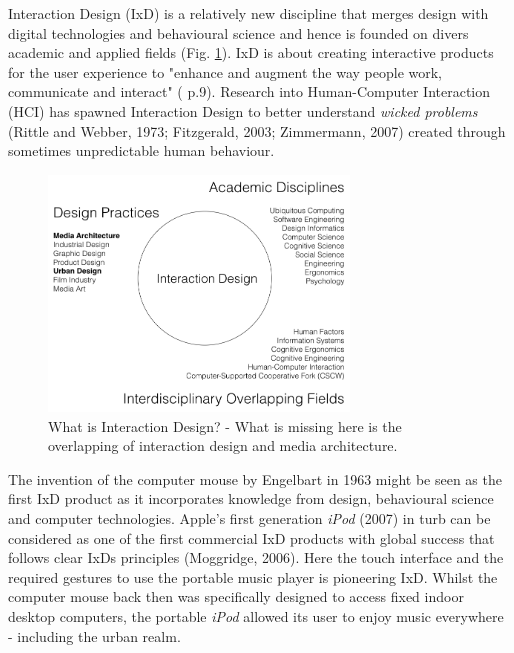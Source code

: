 
Interaction Design (IxD)  is a relatively new discipline that merges design with digital technologies and behavioural science and hence is founded on divers academic and applied fields (Fig. \ref{DesignFields}).
IxD is about creating interactive products for the user experience to "enhance and augment the way people work, communicate and interact" (\cite{Rogers_2015} p.9).
Research into Human-Computer Interaction (HCI)  has spawned Interaction Design \cite{Rogers_2015} to better understand \textit{wicked problems}  (Rittle and Webber, 1973; Fitzgerald, 2003; Zimmermann, 2007) created through sometimes unpredictable human behaviour.



  \begin{figure}[h!]
  \centering
  \includegraphics[width=8cm]{Illustrations/Interaction-Design-Fields.png}
  \caption{What is Interaction Design? \cite{Rogers Interaction Design - beyond HCI 4th Edition p. 9} - What is missing here is the overlapping of interaction design and media architecture.}
  \label{DesignFields}
  \end{figure}

The invention of the computer mouse by Engelbart in 1963  might be seen as the first IxD product as it incorporates knowledge from design, behavioural science and computer technologies.   
Apple's first generation \textit{iPod} (2007)  in turb can be considered as one of the first commercial IxD products with global success that follows clear IxDs principles (Moggridge, 2006). Here the touch interface and the required gestures to use the portable music player is pioneering IxD. 
Whilst the computer mouse back then was specifically designed to access fixed indoor desktop computers, the portable \textit{iPod} allowed its user to enjoy music everywhere - including the urban realm. 

